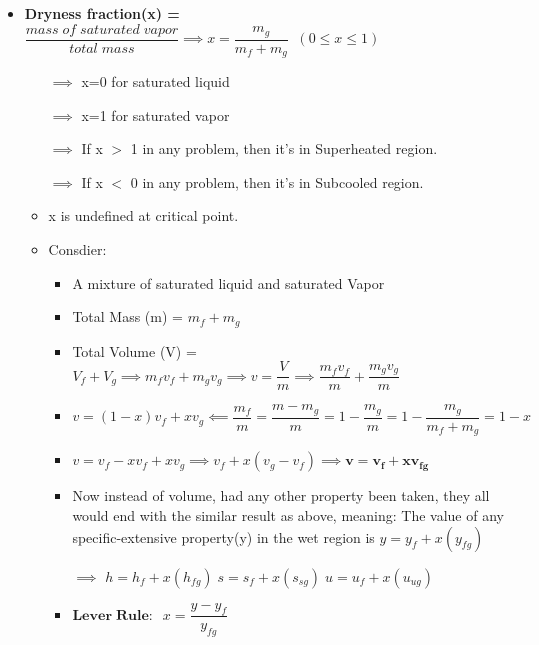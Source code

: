 \documentclass[8pt]{article}
\begin{document}
	\begin{itemize}
		\item \textbf{Dryness fraction(x) = }$\dfrac{mass\;of\;saturated\;vapor}{total\;mass}\implies\boxed {x = \dfrac{m_g}{m_f+m_g}}\;\;(0\le x\le1)$
		\begin{itemize}
			\item[$\implies$] x=0 for saturated liquid 
			\item[$\implies$] x=1 for saturated vapor
			\item[$\implies$] If x $>$ 1 in any problem, then it's in Superheated region.
			\item[$\implies$] If x $<$ 0 in any problem, then it's in Subcooled region.
			\item x is undefined at critical point. 
			\item Consdier:
				\begin{itemize}
					\item A mixture of saturated liquid and saturated Vapor
					\item Total Mass (m) = $m_f + m_g$
					\item Total Volume (V) = $V_f + V_g \implies m_fv_f + m_gv_g \implies v = \dfrac{V}{m} \implies \dfrac{m_fv_f}{m} + \dfrac{m_gv_g}{m}$
					\item $v = (1-x)v_f + xv_g \impliedby \boxed{\dfrac{m_f}{m} = \dfrac{m-m_g}{m} = 1 - \dfrac{m_g}{m} = 1 - \dfrac{m_g}{m_f+m_g} = 1 - x}$
					\item $v=v_f-xv_f+xv_g \implies v_f + x(v_g-v_f) \implies \boxed{\bm{v =  v_f+xv_{fg}}}$
					\item Now instead of volume, had any other property been taken, they all would end with the similar result as above, meaning: The value of any specific-extensive property(y) in the wet region is $y = y_f+x(y_{fg})$
					\item[$\implies$] $\boxed{h=h_f+x(h_{fg})}\;\boxed{s=s_f+x(s_{sg})}\; \boxed{u=u_f+x(u_{ug})}$
					\item $\boxed{\bm{Lever\;Rule:\;}\;x = \dfrac{y-y_f}{y_{fg}}}$
				\end{itemize}
		\end{itemize}		 
	\end{itemize}\hrulefill\\\\
\end{document}
